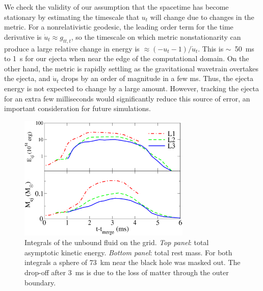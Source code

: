 We check the validity of our assumption that the spacetime has become
stationary by estimating the timescale that $u_t$ will change due to changes
in the metric.  For a nonrelativistic geodesic, the leading order term for
the time derivative is $\dot{u}_t\approx g_{tt,t}$, so the timescale on which
metric nonstationarity can produce a large relative change in energy is
$\approx (-u_t-1)/\dot{u}_t$.  This is $\sim$~50~ms to 1~s for our ejecta
when near the edge of the computational domain.  On the other hand, the
metric is rapidly settling as the gravitational wavetrain overtakes the
ejecta, and $\dot{u}_t$ drops by an order of magnitude in a few ms.  Thus,
the ejecta energy is not expected to change by a large amount.  However,
tracking the ejecta for an extra few milliseconds would significantly
reduce this source of error, an important consideration for future
simulations.

\begin{figure}
\includegraphics[width=8.2cm]{Figures/unbound_mass_and_energy_over_time}
\caption[Unbound matter mass and kinetic energy]{
Integrals of the unbound fluid on the grid.
{\em Top panel}: total asymptotic kinetic energy.
{\em Bottom panel}: total rest mass.
For both integrals a sphere of 73~km near the black hole was masked out.
The drop-off after 3~ms is due to the loss of matter through
the outer boundary.
}
\label{fig:ejecta_mass_and_energy}
\end{figure}

